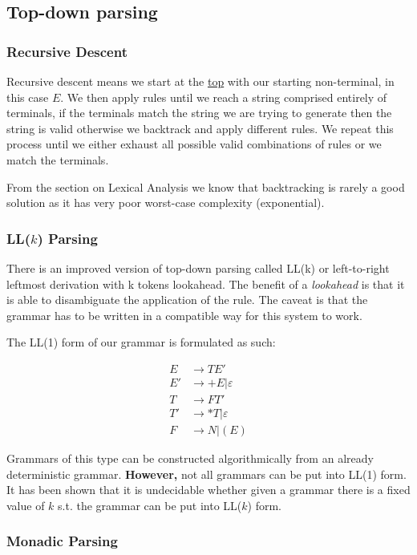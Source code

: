 \documentclass{article}
\renewcommand{\i}[1]{\textit{#1}}
\renewcommand{\u}[1]{\underline{#1}}
\begin{document}
\subsection{Top-down parsing}
\subsubsection{Recursive Descent}
Recursive descent means we start at the \u{top} with our starting non-terminal, in this case $E$. We then apply rules until we reach a string comprised entirely of terminals, if the terminals match the string we are trying to generate then the string is valid otherwise we backtrack and apply different rules. We repeat this process until we either exhaust all possible valid combinations of rules or we match the terminals.

From the section on Lexical Analysis we know that backtracking is rarely a good solution as it has very poor worst-case complexity (exponential).

\subsubsection{LL($k$) Parsing}
There is an improved version of top-down parsing called LL(k) or left-to-right leftmost derivation with k tokens lookahead. The benefit of a \i{lookahead} is that it is able to disambiguate the application of the rule. The caveat is that the grammar has to be written in a compatible way for this system to work.

The LL(1) form of our grammar is formulated as such:

\begin{align*}
    E &\rightarrow T E' \\
    E' &\rightarrow + E | \varepsilon \\
    T &\rightarrow F T' \\
    T' &\rightarrow * T| \varepsilon \\
    F &\rightarrow N | ( E )
\end{align*}

Grammars of this type can be constructed algorithmically from an already deterministic grammar. \textbf{However,} not all grammars can be put into LL(1) form. It has been shown that it is undecidable whether given a grammar there is a fixed value of $k$ s.t. the grammar can be put into LL($k$) form.

\subsubsection{Monadic Parsing}
\end{document}
